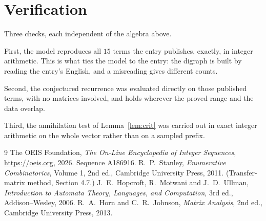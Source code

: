 \documentclass[11pt,a4paper]{article}
\theoremstyle{plain}
\theoremstyle{definition}
\begin{document}
\section{Verification}

Three checks, each independent of the algebra above.

First, the model reproduces all $15$ terms the entry publishes, exactly, in integer
arithmetic. This is what ties the model to the entry: the digraph is built by reading the
entry's English, and a misreading gives different counts.

Second, the conjectured recurrence was evaluated directly on those published terms, with no
matrices involved, and holds wherever the proved range and the data overlap.

Third, the annihilation test of Lemma~\ref{lem:crit} was carried out in exact integer
arithmetic on the whole vector rather than on a sampled prefix.

\begin{thebibliography}{9}
 The OEIS Foundation, \emph{The On-Line Encyclopedia of Integer
Sequences}, \url{https://oeis.org}, 2026. Sequence A186916.
 R.~P.~Stanley, \emph{Enumerative Combinatorics}, Volume 1, 2nd ed.,
Cambridge University Press, 2011. (Transfer-matrix method, Section 4.7.)
 J.~E.~Hopcroft, R.~Motwani and J.~D.~Ullman, \emph{Introduction to Automata
Theory, Languages, and Computation}, 3rd ed., Addison--Wesley, 2006.
 R.~A.~Horn and C.~R.~Johnson, \emph{Matrix Analysis}, 2nd ed., Cambridge
University Press, 2013.
\end{thebibliography}
\end{document}
